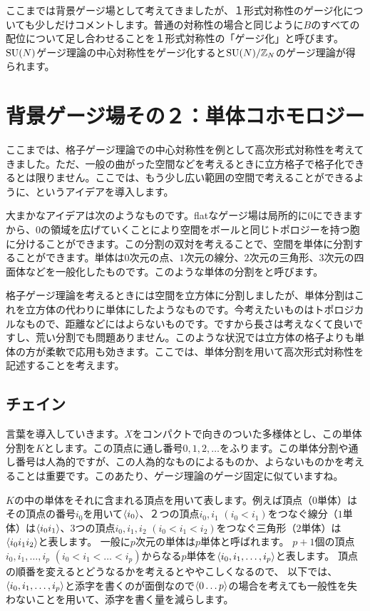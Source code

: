 \documentclass[generalized_symmetry.tex]{subfiles}
\begin{document}
ここまでは背景ゲージ場として考えてきましたが、１形式対称性のゲージ化についても少しだけコメントします。普通の対称性の場合と同じように$B$のすべての配位について足し合わせることを１形式対称性の「ゲージ化」と呼びます。$\mbox{SU}(N)$ゲージ理論の中心対称性をゲージ化すると$\mbox{SU}(N)/\mathbb{Z}_N$のゲージ理論が得られます。

\section{背景ゲージ場その２：単体コホモロジー}
ここまでは、格子ゲージ理論での中心対称性を例として高次形式対称性を考えてきました。ただ、一般の曲がった空間などを考えるときに立方格子で格子化できるとは限りません。ここでは、もう少し広い範囲の空間で考えることができるように、というアイデアを導入します。

大まかなアイデアは次のようなものです。flatなゲージ場は局所的に$0$にできますから、$0$の領域を広げていくことにより空間をボールと同じトポロジーを持つ胞に分けることができます。この分割の双対を考えることで、空間を単体に分割することができます。単体は$0$次元の点、$1$次元の線分、$2$次元の三角形、$3$次元の四面体などを一般化したものです。このような単体の分割をと呼びます。

格子ゲージ理論を考えるときには空間を立方体に分割しましたが、単体分割はこれを立方体の代わりに単体にしたようなものです。今考えたいものはトポロジカルなもので、距離などにはよらないものです。ですから長さは考えなくて良いですし、荒い分割でも問題ありません。このような状況では立方体の格子よりも単体の方が柔軟で応用も効きます。ここでは、単体分割を用いて高次形式対称性を記述することを考えます。

\subsection{チェイン}
言葉を導入していきます。$X$をコンパクトで向きのついた多様体とし、この単体分割を$K$とします。この頂点に通し番号$0,1,2,\dots$をふります。この単体分割や通し番号は人為的ですが、この人為的なものによるものか、よらないものかを考えることは重要です。このあたり、ゲージ理論のゲージ固定に似ていますね。

$K$の中の単体をそれに含まれる頂点を用いて表します。例えば頂点（$0$単体）はその頂点の番号$i_0$を用いて$\expval{i_0}$、２つの頂点$i_0,i_1$ $(i_0<i_1)$をつなぐ線分（$1$単体）は$\expval{i_0 i_1}$、$3$つの頂点$i_0,i_1,i_2$ $(i_0<i_1<i_2)$をつなぐ三角形（$2$単体）は$\expval{i_0 i_1 i_2}$と表します。
一般に$p$次元の単体は$p$単体と呼ばれます。
$p+1$個の頂点$i_0,  i_1,\dots,i_p$ $(i_0<i_1<\dots<i_p)$からなる$p$単体を$\expval{i_0,i_1,\dots,i_p}$と表します。
頂点の順番を変えるとどうなるかを考えるとややこしくなるので、
以下では、$\expval{i_0,i_1,\dots,i_p}$と添字を書くのが面倒なので$\expval{0\dots p}$の場合を考えても一般性を失わないことを用いて、添字を書く量を減らします。
\end{document}
